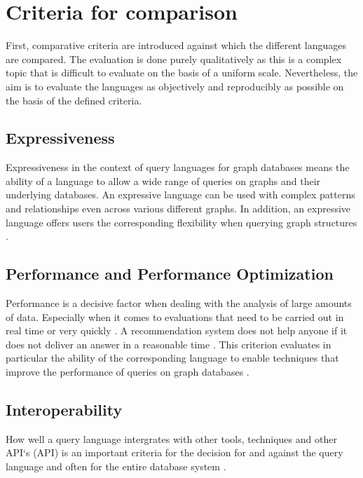 \chapter{Criteria for comparison}
\label{ch:criteria_for_comparison}
First, comparative criteria are introduced against which the different languages are compared.
The evaluation is done purely qualitatively as this is a complex topic that is difficult to evaluate on the basis of a uniform scale. 
Nevertheless, the aim is to evaluate the languages as objectively and reproducibly as possible on the basis of the defined criteria.

\section{Expressiveness}
\label{sec:criteria_for_comparison:expressiveness}
Expressiveness in the context of query languages for graph databases means the ability 
of a language to allow a wide range of queries on graphs and their underlying databases.
An expressive language can be used with complex patterns and relationships
even across various different graphs.
In addition, an expressive language offers users the corresponding flexibility
when querying graph structures \citep{barcelo_expressive_2012}.

\section{Performance and Performance Optimization}
\label{sec:criteria_for_comparison:performance}
Performance is a decisive factor when dealing with the analysis of large amounts of data. 
Especially when it comes to evaluations that need to be carried 
out in real time or very quickly \citep{yuanyuan_tian_world_2022}. 
A recommendation system does not help anyone if it does not deliver 
an answer in a reasonable time \citep{MONDAL2020103549}.
This criterion evaluates in particular the ability 
of the corresponding language to enable techniques 
that improve the performance of queries on graph databases \citep{yuanyuan_tian_world_2022}.


\section{Interoperability}
\label{sec:criteria_for_comparison:interoperability}
How well a query language intergrates with other tools, techniques and other API`s (\ac{API}) is an important
criteria for the decision for and against the query language and often for the entire 
database system \citep{timon-reina_overview_2021}.

